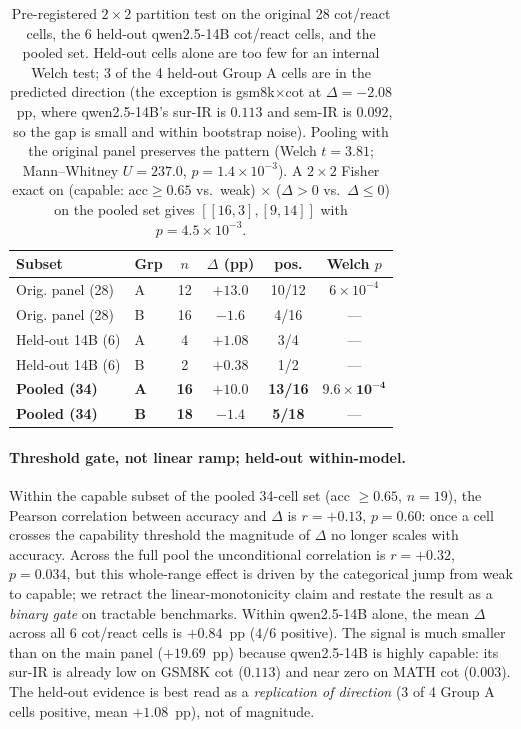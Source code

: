 \documentclass[11pt]{article}
\begin{document}
\begin{table}[t]
\centering
\footnotesize
\setlength{\tabcolsep}{4pt}
\begin{tabular}{@{}llcccc@{}}
\toprule
\textbf{Subset} & \textbf{Grp} & $n$ & \textbf{$\Delta$ (pp)} & \textbf{pos.} & \textbf{Welch $p$} \\
\midrule
Orig. panel (28)         & A & 12 & $+13.0$ & 10/12 & $6\!\times\!10^{-4}$ \\
Orig. panel (28)         & B & 16 & $-1.6$  & 4/16  & --- \\
\midrule
Held-out 14B (6)         & A & 4  & $+1.08$ & 3/4   & --- \\
Held-out 14B (6)         & B & 2  & $+0.38$ & 1/2   & --- \\
\midrule
\textbf{Pooled (34)}     & \textbf{A} & \textbf{16} & $\mathbf{+10.0}$ & \textbf{13/16} & $\mathbf{9.6\!\times\!10^{-4}}$ \\
\textbf{Pooled (34)}     & \textbf{B} & \textbf{18} & $\mathbf{-1.4}$  & \textbf{5/18}  & --- \\
\bottomrule
\end{tabular}
\caption{Pre-registered $2\times 2$ partition test on the original 28 cot/react cells, the 6 held-out qwen2.5-14B cot/react cells, and the pooled set. Held-out cells alone are too few for an internal Welch test; 3 of the 4 held-out Group A cells are in the predicted direction (the exception is gsm8k$\times$cot at $\Delta=-2.08$~pp, where qwen2.5-14B's sur-IR is $0.113$ and sem-IR is $0.092$, so the gap is small and within bootstrap noise). Pooling with the original panel preserves the pattern (Welch $t{=}3.81$; Mann--Whitney $U{=}237.0$, $p{=}1.4\!\times\!10^{-3}$). A $2\times 2$ Fisher exact on (capable: acc${\geq}0.65$ vs.\ weak) $\times$ ($\Delta>0$ vs.\ $\Delta\leq 0$) on the pooled set gives $[[16,3],[9,14]]$ with $p{=}4.5\!\times\!10^{-3}$.}
\label{tab:partition}
\end{table}

\paragraph{Threshold gate, not linear ramp; held-out within-model.} Within the capable subset of the pooled 34-cell set (acc $\geq 0.65$, $n{=}19$), the Pearson correlation between accuracy and $\Delta$ is $r{=}+0.13$, $p{=}0.60$: once a cell crosses the capability threshold the magnitude of $\Delta$ no longer scales with accuracy. Across the full pool the unconditional correlation is $r{=}+0.32$, $p{=}0.034$, but this whole-range effect is driven by the categorical jump from weak to capable; we retract the linear-monotonicity claim and restate the result as a \emph{binary gate} on tractable benchmarks. Within qwen2.5-14B alone, the mean $\Delta$ across all 6 cot/react cells is $+0.84$~pp ($4/6$ positive). The signal is much smaller than on the main panel ($+19.69$~pp) because qwen2.5-14B is highly capable: its sur-IR is already low on GSM8K cot ($0.113$) and near zero on MATH cot ($0.003$). The held-out evidence is best read as a \emph{replication of direction} (3 of 4 Group A cells positive, mean $+1.08$~pp), not of magnitude.
\end{document}
